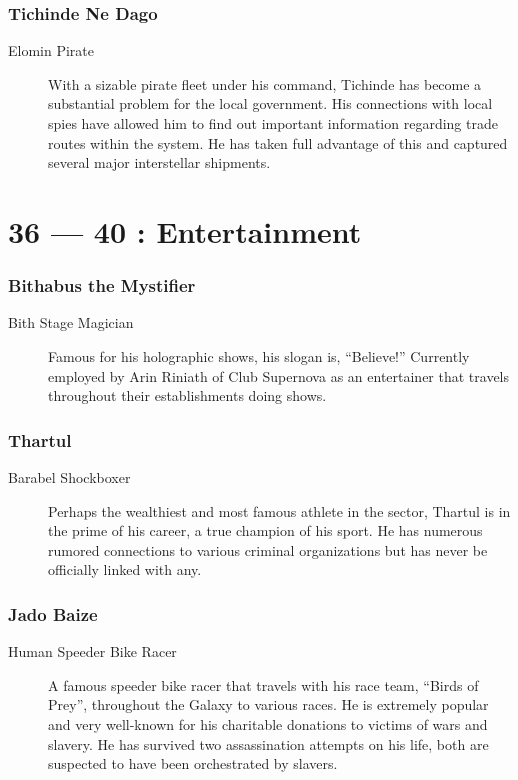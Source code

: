 \documentclass{article}
\begin{document}
\section{Tichinde Ne Dago}
\begin{description}
	\item [Elomin \male Pirate] With a sizable pirate fleet under his command, Tichinde has become a substantial problem for the local government. His connections with local spies have allowed him to find out important information regarding trade routes within the system. He has taken full advantage of this and captured several major interstellar shipments.
\end{description}

\part*{36 --- 40 : Entertainment}
\setcounter{section}{35}
\section{Bithabus the Mystifier}
\begin{description}
	\item [Bith \male Stage Magician] Famous for his holographic shows, his slogan is, “Believe!” Currently employed by Arin Riniath of Club Supernova as an entertainer that travels throughout their establishments doing shows.
\end{description}
\section{Thartul}
\begin{description}
	\item [Barabel \male Shockboxer] Perhaps the wealthiest and most famous athlete in the sector, Thartul is in the prime of his career, a true champion of his sport. He has numerous rumored connections to various criminal organizations but has never be officially linked with any.
\end{description}
\section{Jado Baize}
\begin{description}
	\item [Human \male Speeder Bike Racer] A famous speeder bike racer that travels with his race team, “Birds of Prey”, throughout the Galaxy to various races. He is extremely popular and very well-known for his charitable donations to victims of wars and slavery. He has survived two assassination attempts on his life, both are suspected to have been orchestrated by slavers.
\end{description}
\end{document}
